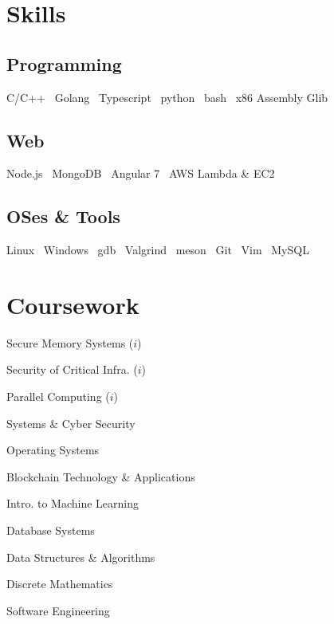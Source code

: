 \documentclass[]{deedy-resume-reversed}
\begin{document}
\begin{minipage}[t]{0.33\textwidth}

\section{Skills}
\subsection{Programming}
    C/C++  \textbullet\ Golang  \textbullet\ Typescript \textbullet\
    python \textbullet\ bash  \textbullet\ x86 Assembly \textbullet{} Glib
\sectionsep

\subsection{Web}
    Node.js \textbullet\ MongoDB \textbullet\ Angular 7 \textbullet\ AWS Lambda \& EC2
\sectionsep

    \subsection{OSes \& Tools}
    Linux \textbullet\ Windows \textbullet\ gdb \textbullet\ Valgrind \textbullet\ meson \textbullet\  Git \textbullet\ Vim \textbullet\ MySQL
\sectionsep


\section{Coursework}
\vspace{10pt} %
\begin{tightemize}
\item Secure Memory Systems ($i$)
\item Security of Critical Infra. ($i$)
\item Parallel Computing ($i$)
\item Systems \& Cyber Security
\item Operating Systems
\item Blockchain Technology \& Applications
\item Intro. to Machine Learning
\item Database Systems
\item Data Structures \& Algorithms
\item Discrete Mathematics
\item Software Engineering
\end{tightemize}
\sectionsep


\end{minipage}
\end{document}
